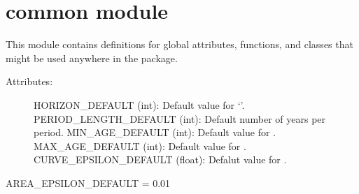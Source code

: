 \documentclass[letterpaper,10pt,english]{sphinxmanual}
\begin{document}
\section{common module}
\label{\detokenize{common:common-module}}\label{\detokenize{common::doc}}\label{\detokenize{common:module-common}}
This module contains definitions for global attributes, functions, and classes that might be used anywhere in the package.
\begin{description}
\item[{Attributes:}] \leavevmode
HORIZON\_DEFAULT (int): Default value for ‘’.
PERIOD\_LENGTH\_DEFAULT (int): Default number of years per period.
MIN\_AGE\_DEFAULT (int): Default value for .
MAX\_AGE\_DEFAULT (int): Default value for .
CURVE\_EPSILON\_DEFAULT (float): Defalut value for .

\end{description}

AREA\_EPSILON\_DEFAULT = 0.01
\end{document}
